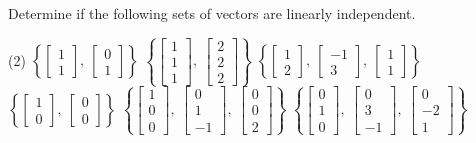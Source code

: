 \documentclass{ximera}
\begin{document}
\begin{exercise}
    Determine if the following sets of vectors are linearly independent.
    \begin{tasks}(2)
        \task $\displaystyle \left\{ \begin{bmatrix} 1 \\ 1 \end{bmatrix},\ \begin{bmatrix} 0 \\ 1 \end{bmatrix}\right\}$
        \task $\displaystyle \left\{ \begin{bmatrix} 1 \\ 1 \\ 1 \end{bmatrix},\ \begin{bmatrix} 2 \\ 2 \\ 2 \end{bmatrix} \right\}$
        \task $\displaystyle \left\{ \begin{bmatrix} 1 \\ 2 \end{bmatrix},\ \begin{bmatrix} -1 \\ 3 \end{bmatrix},\ \begin{bmatrix}  1 \\ 1 \end{bmatrix}\right\}$
        \task $\displaystyle \left\{ \begin{bmatrix}  1 \\ 0 \end{bmatrix},\ \begin{bmatrix} 0 \\ 0 \end{bmatrix}\right\}$
        \task $\displaystyle \left\{ \begin{bmatrix} 1 \\ 0 \\ 0 \end{bmatrix},\ \begin{bmatrix} 0 \\ 1 \\ -1 \end{bmatrix},\ \begin{bmatrix} 0 \\ 0 \\ 2 \end{bmatrix}\right\}$
        \task $\displaystyle \left\{ \begin{bmatrix} 0 \\ 1 \\ 0 \end{bmatrix},\ \begin{bmatrix} 0 \\ 3 \\ -1 \end{bmatrix},\ \begin{bmatrix} 0 \\ -2 \\ 1 \end{bmatrix}\right\}$
    \end{tasks}
\end{exercise}
\end{document}
